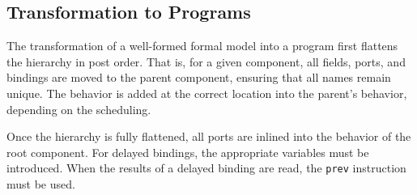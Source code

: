 \documentclass[a4paper,10pt,english]{article}
\begin{document}
% 
% 

\subsection{Transformation to \Fil Programs}
The transformation of a well-formed formal model into a \Fil program first flattens the hierarchy in post order. That is, for a
given component, all fields, ports, and bindings are moved to the parent component, ensuring that all names remain unique. The behavior
is added at the correct location into the parent's behavior, depending on the scheduling. 

Once the hierarchy is fully flattened, all ports are inlined into the behavior of the root component. For delayed bindings, the
appropriate variables must be introduced. When the results of a delayed binding are read, the \texttt{prev} instruction must be used.
\end{document}
